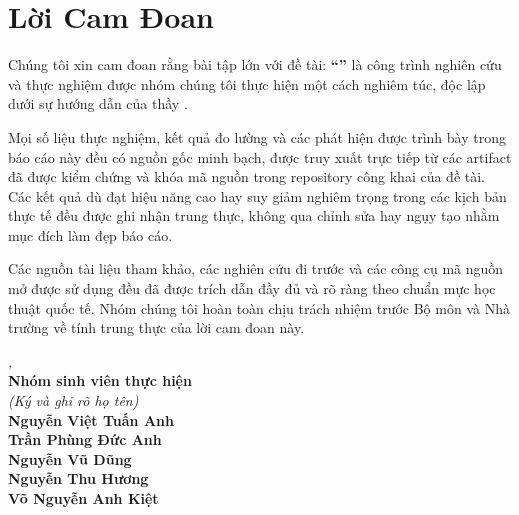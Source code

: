 
\chapter*{Lời Cam Đoan}

Chúng tôi xin cam đoan rằng bài tập lớn với đề tài: \textbf{``\ReportTitle''} là công trình nghiên cứu và thực nghiệm được nhóm chúng tôi thực hiện một cách nghiêm túc, độc lập dưới sự hướng dẫn của thầy \textbf{\ReportSupervisor}.

Mọi số liệu thực nghiệm, kết quả đo lường và các phát hiện được trình bày trong báo cáo này đều có nguồn gốc minh bạch, được truy xuất trực tiếp từ các artifact đã được kiểm chứng và khóa mã nguồn trong repository công khai của đề tài. Các kết quả dù đạt hiệu năng cao hay suy giảm nghiêm trọng trong các kịch bản thực tế đều được ghi nhận trung thực, không qua chỉnh sửa hay ngụy tạo nhằm mục đích làm đẹp báo cáo.

Các nguồn tài liệu tham khảo, các nghiên cứu đi trước và các công cụ mã nguồn mở được sử dụng đều đã được trích dẫn đầy đủ và rõ ràng theo chuẩn mực học thuật quốc tế. Nhóm chúng tôi hoàn toàn chịu trách nhiệm trước Bộ môn và Nhà trường về tính trung thực của lời cam đoan này.

\vspace{1.0cm}

\noindent
\hfill
\begin{minipage}{8cm}
    \centering
    \textit{\ReportLocation, \ReportDate}\\[0.3cm]
    \textbf{Nhóm sinh viên thực hiện}\\[0.15cm]
    \textit{(Ký và ghi rõ họ tên)}\\[2.0cm]
    \textbf{Nguyễn Việt Tuấn Anh}\\[0.25cm]
    \textbf{Trần Phùng Đức Anh}\\[0.25cm]
    \textbf{Nguyễn Vũ Dũng}\\[0.25cm]
    \textbf{Nguyễn Thu Hương}\\[0.25cm]
    \textbf{Võ Nguyễn Anh Kiệt}
\end{minipage}

